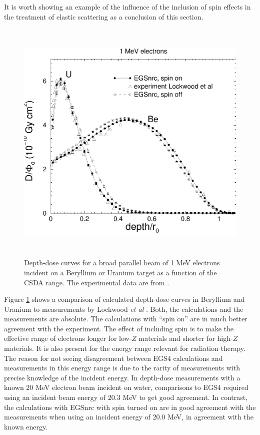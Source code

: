 It is worth showing an example of the influence of the inclusion 
of spin effects in the treatment of elastic scattering as 
a conclusion of this section. 
\begin{figure}[htp]
\includegraphics[height=12cm,width=12cm]{figures/dd_1MeV_Be_and_U}
\caption[Depth-dose curves in Beryllium and Uranium]{\label{dd_spin} 
Depth-dose curves 
for a broad parallel beam of 1 MeV electrons incident 
on a Beryllium or Uranium target as a function of the CSDA range. 
The experimental data are from \protect\cite{Lo80a}.}
\end{figure} 
Figure \ref{dd_spin} shows a comparison of calculated depth-dose curves 
in Beryllium and Uranium to measurements by Lockwood {\em et al} \cite{Lo80a}.
Both, the calculations and the measurements are absolute. 
The calculations with ``spin on'' are in much better agreement 
with the experiment. The effect of including spin is 
to make the effective range of electrons longer for low-$Z$ 
materials and shorter for high-$Z$ materials. It is also 
present for the energy range relevant for radiation therapy. 
The reason for not seeing disagreement between EGS4 calculations 
and measurements in this energy range is due to the rarity of 
measurements 
with precise knowledge of the incident energy. In depth-dose measurements
with a known 20 MeV electron beam incident on water, comparisons to EGS4
required using an incident beam energy of 20.3 MeV to get good
agreement\cite{Ro95}. In contrast, the calculations with EGSnrc with spin
turned on are in good
agreement with the measurements when using an incident energy of 20.0 MeV,
in agreement with the known energy.

